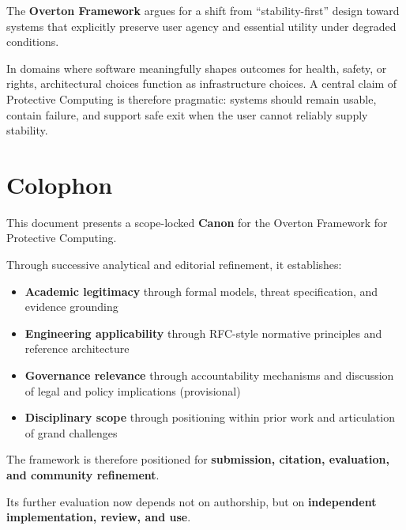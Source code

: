 \documentclass[12pt]{article}
\begin{document}
The \textbf{Overton Framework} argues for a shift from ``stability-first'' design toward systems that explicitly preserve user agency and essential utility under degraded conditions.

In domains where software meaningfully shapes outcomes for health, safety, or rights, architectural choices function as infrastructure choices. A central claim of Protective Computing is therefore pragmatic: systems should remain usable, contain failure, and support safe exit when the user cannot reliably supply stability.

\section*{Colophon}

This document presents a scope-locked \textbf{Canon} for the Overton Framework for Protective Computing.

Through successive analytical and editorial refinement, it establishes:

\begin{itemize}
\item \textbf{Academic legitimacy} through formal models, threat specification, and evidence grounding
\item \textbf{Engineering applicability} through RFC-style normative principles and reference architecture
\item \textbf{Governance relevance} through accountability mechanisms and discussion of legal and policy implications (provisional)
\item \textbf{Disciplinary scope} through positioning within prior work and articulation of grand challenges
\end{itemize}

The framework is therefore positioned for \textbf{submission, citation, evaluation, and community refinement}.

Its further evaluation now depends not on authorship,
but on \textbf{independent implementation, review, and use}.



\end{document}
